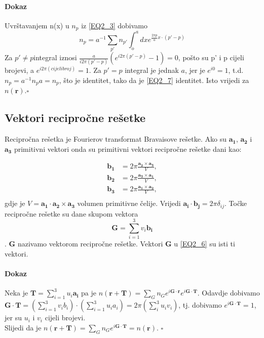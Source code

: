\documentclass{article}
\numberwithin{equation}{section}
\begin{document}
   \paragraph{Dokaz} Uvrštavanjem n(x) u $n_p$ iz \ref{EQ2_3} dobivamo 
   \begin{equation}
       n_p=a^{-1}\sum_{p'}n_{p'}\int_o ^a dx e^{\frac{2\pi p}{a}x \cdot(p'-p)}
   \end{equation}
   Za $p'\neq p $integral iznosi $\frac{a}{i 2 \pi (p'-p)}(e^{i 2 \pi (p'-p)}-1)=0$, pošto su 
	 p' i p cijeli brojevi, a $e^{i 2\pi (cijeli broj)}=1$. Za $p' = p$ integral je jednak $a$, jer je $e^{i 0}=1$,
	 t.d. $n_p=a^{-1}n_p a= n_p$, što je identitet, tako da je \ref{EQ2_7} identitet. Isto vrijedi za $n\left(\mathbf{r}\right)$.\hfill $\square$
   \subsection{Vektori recipročne rešetke}
   Recipročna rešetka je Fourierov transformat Bravaisove rešetke. Ako su $\mathbf{a_1}$, $\mathbf{a_2}$ i $\mathbf{a_3}$ primitivni vektori onda su primitivni vektori recipročne rešetke dani kao: 
 
     \begin{equation}
     \begin{split}
\mathbf{b_1}&=2\pi \frac{\mathbf{a_2}\times \mathbf{a_3}}{V},  \\
\mathbf{b_2}&=2\pi \frac{\mathbf{a_3}\times \mathbf{a_1}}{V}, \\
\mathbf{b_3}&=2\pi \frac{\mathbf{a_1} \times\mathbf{a_2}}{V}, \\
     \end{split}
   \end{equation}
   gdje je $V=\mathbf{a_1}\cdot \mathbf{a_2}\times \mathbf{a_3}$ volumen primitivne čelije. Vrijedi $\mathbf{a_i}\cdot\mathbf{b_j}=2 \pi \delta_{ij}$.
   Točke recipročne rešetke su dane skupom vektora 
   \begin{equation}
       \mathbf{G}=\sum_{i=1}^3v_i\mathbf{b_i}
   \end{equation}.
   $\mathbf{G}$ nazivamo vektorom recipročne rešetke. Vektori $\mathbf{G}$ u \ref{EQ2_6} su isti ti vektori.
   \paragraph{Dokaz}
   Neka je $\mathbf{T}=\sum_{i=1}^3 u_i \mathbf{a_i}$ pa je $n(\mathbf{r+T})=\sum_G n_G e^{i\mathbf{G}\cdot \mathbf{r}}e^{i\mathbf{G}\cdot \mathbf{T}}$. 
   Odavdje dobivamo $\mathbf{G\cdot T}=\left(\sum_{i=1}^3v_i b_i\right)\cdot \left(\sum_{i=1}^3 u_i a_i \right) = 2\pi \left(\sum_i^3 u_i v_i \right)$, 
	 tj. dobivamo $e^{i\mathbf{G \cdot T}}=1$, jer su $u_i$ i $v_i$ cijeli brojevi.\\
	 Slijedi da je $n(\mathbf{r+T})=\sum_G n_G e^{i\mathbf{G \cdot T}}=n(\mathbf{r})$. \hfill $\square$
   
\end{document}
